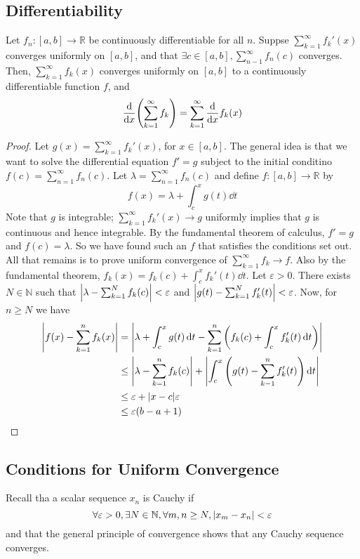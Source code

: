 \subsection{Differentiability}
\begin{theorem}
	Let \( f_n \colon [a,b] \to \mathbb R \) be continuously differentiable for all \( n \).
	Suppse \( \sum_{k=1}^\infty f_k'(x) \) converges uniformly on \( [a,b] \), and that \( \exists c \in [a,b], \sum_{n-1}^\infty f_n(c) \) converges.
	Then, \( \sum_{k=1}^\infty f_k(x) \) converges uniformly on \( [a,b] \) to a continuously differentiable function \( f \), and
	\[
		\dv{x} \qty(\sum_{k=1}^\infty f_k) = \sum_{k=1}^\infty \dv{x} f_k(x)
	\]
\end{theorem}
\begin{proof}
	Let \( g(x) = \sum_{k=1}^\infty f_k'(x) \), for \( x \in [a,b] \).
	The general idea is that we want to solve the differential equation \( f' = g \) subject to the initial conditino \( f(c) = \sum_{n=1}^\infty f_n(c) \).
	Let \( \lambda = \sum_{n=1}^\infty f_n(c) \) and define \( f \colon [a,b] \to \mathbb R \) by
	\[
		f(x) = \lambda + \int_c^x g(t) \dd{t}
	\]
	Note that \( g \) is integrable; \( \sum_{k=1}^\infty f_k'(x) \to g \) uniformly implies that \( g \) is continuous and hence integrable.
	By the fundamental theorem of calculus, \( f' = g \) and \( f(c) = \lambda \).
	So we have found such an \( f \) that satisfies the conditions set out.
	All that remains is to prove uniform convergence of \( \sum_{k=1}^\infty f_k \to f \).
	Also by the fundamental theorem, \( f_k(x) = f_k(c) + \int_c^x f_k'(t) \dd{t} \).
	Let \( \varepsilon > 0 \).
	There exists \( N \in \mathbb N \) such that \( \abs{\lambda - \sum_{k=1}^N f_k(c)} < \varepsilon \) and \( \abs{g(t) - \sum_{k=1}^N f_k'(t)} < \varepsilon \).
	Now, for \( n \geq N \) we have
	\begin{align*}
		\abs{f(x) - \sum_{k=1}^n f_k(x)} & = \abs{\lambda + \int_c^x g(t) \dd{t} - \sum_{k=1}^n \qty(f_k(c) + \int_c^x f_k'(t) \dd{t})}       \\
		                                 & \leq \abs{\lambda - \sum_{k=1}^n f_k(c)} + \abs{\int_c^x \qty(g(t) - \sum_{k-1}^n f_k'(t)) \dd{t}} \\
		                                 & \leq \varepsilon + \abs{x-c} \varepsilon                                                           \\
		                                 & \leq \varepsilon (b-a + 1)
	\end{align*}
\end{proof}

\subsection{Conditions for Uniform Convergence}
Recall tha a scalar sequence \( x_n \) is Cauchy if
\[
	\forall \varepsilon > 0, \exists N \in \mathbb N, \forall m,n \geq N, \abs{x_m - x_n} < \varepsilon
\]
and that the general principle of convergence shows that any Cauchy sequence converges.

